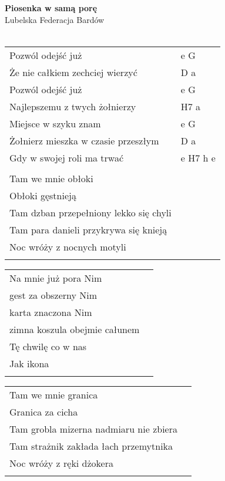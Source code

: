 \documentclass[a5paper]{article}
\begin{document}


\noindent
\fontsize{12pt}{15pt}\selectfont
\textbf{Piosenka w samą porę} \\
\fontsize{8pt}{10pt}\selectfont
Lubelska Federacja Bardów \\ \\
\fontsize{10pt}{12pt}\selectfont
{}
\begin{tabular}{@{}p{7.00cm}p{3cm}@{}}
\noindent
Pozwól odejść już & e G \\
Że nie całkiem zechciej wierzyć & D a \\
Pozwól odejść już & e G\\
Najlepszemu z twych żołnierzy & H7 a \\
Miejsce w szyku znam & e G \\
Żołnierz mieszka w czasie przeszłym & D a \\
Gdy w swojej roli ma trwać & e H7 h e \\ \\

Tam we mnie obłoki \\
Obłoki gęstnieją \\
Tam dzban przepełniony lekko się chyli \\
Tam para danieli przykrywa się knieją \\
Noc wróży z nocnych motyli \\ \\
\end{tabular}

\noindent
\begin{tabular}{@{}p{6.00cm}p{3cm}@{}}
Na mnie już pora Nim \\
gest za obszerny Nim \\
karta znaczona Nim \\
zimna koszula obejmie całunem \\
Tę chwilę co w nas \\
Jak ikona \\ \\
\end{tabular}

\noindent
\begin{tabular}{@{}p{6.00cm}p{3cm}@{}}
Tam we mnie granica \\
Granica za cicha \\
Tam grobla mizerna nadmiaru nie zbiera \\
Tam strażnik zakłada łach przemytnika \\
Noc wróży z ręki dżokera \\ \\
\end{tabular}
\end{document}

